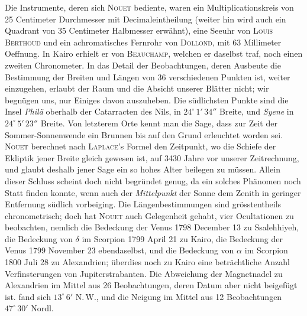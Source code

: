 Die Instrumente, deren sich \textsc{Nouet} bediente, waren ein Multiplicationskreis von 25 Centimeter Durchmesser mit Decimaleintheilung (weiter hin wird auch ein Quadrant von 35 Centimeter Halbmesser erwähnt), eine Seeuhr von \textsc{Louis Berthoud} und ein achromatisches Fernrohr von \textsc{Dollond}, mit 63 Millimeter Oeffnung. In Kairo erhielt er von \textsc{Beauchamp}, welchen er daselbst traf, noch einen zweiten Chronometer. In das Detail der Beobachtungen, deren Ausbeute die Bestimmung der Breiten und Längen von 36 verschiedenen Punkten ist, weiter einzugehen, erlaubt der Raum und die Absicht unserer Blätter nicht; wir begnügen uns, nur Einiges davon auszuheben. Die südlichsten Punkte sind die Insel \emph{Philä} oberhalb der Catarracten des Nils, in $24^\circ\,1'\,34''$ Breite, und \emph{Syene} in $24^\circ\,5'\,23''$ Breite. Von letzterem Orte kennt man die Sage, dass zur Zeit der Sommer-Sonnenwende ein Brunnen bis auf den Grund erleuchtet worden sei. \textsc{Nouet} berechnet nach \textsc{Laplace}'s Formel den Zeitpunkt, wo die Schiefe der Ekliptik jener Breite gleich gewesen ist, auf 3430 Jahre vor unserer Zeitrechnung, und glaubt deshalb jener Sage ein so hohes Alter beilegen zu müssen. Allein dieser Schluss scheint doch nicht begründet genug, da ein solches Phänomen noch Statt finden konnte, wenn auch der \emph{Mittelpunkt} der Sonne dem Zenith in geringer Entfernung südlich vorbeiging. Die Längenbestimmungen sind grösstentheils chronometrisch; doch hat \textsc{Nouet} auch Gelegenheit gehabt, vier Ocultationen zu beobachten, nemlich die Bedeckung der Venus 1798 December 13 zu Ssalehhiyeh, die Bedeckung von $\delta$ im Scorpion 1799 April 21 zu Kairo, die Bedeckung der Venus 1799 November 23 ebendaselbst, und die Bedeckung von $\alpha$ im Scorpion 1800 Juli 28 zu Alexandrien; überdies noch zu Kairo eine beträchtliche Anzahl Verfinsterungen von Jupiterstrabanten. Die Abweichung der Magnetnadel zu Alexandrien im Mittel aus 26 Beobachtungen, deren Datum aber nicht beigefügt ist. fand sich $13^\circ\,6'$ N.\,W., und die Neigung im Mittel aus 12 Beobachtungen $47^\circ\,30'$ Nordl.
